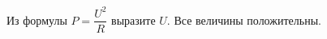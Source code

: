 \begin{ex}[type=]
	\begin{condition}
		Из формулы \( P=\dfrac{U^2}{R} \) выразите \( U \). Все величины положительны.
	\end{condition}
\end{ex}